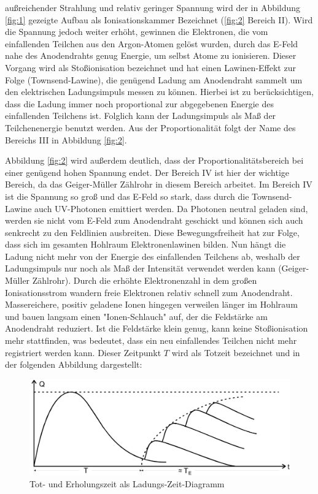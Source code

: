     \justifying außreichender Strahlung und relativ geringer Spannung wird
    der in Abbildung \ref{fig:1} gezeigte Aufbau als Ionisationskammer Bezeichnet (\ref{fig:2}
    Bereich II). Wird die Spannung jedoch weiter erhöht, gewinnen die Elektronen, die vom 
    einfallenden Teilchen aus den Argon-Atomen gelöst wurden, durch das E-Feld nahe des 
    Anodendrahts genug Energie, um selbst Atome zu ionisieren. Dieser Vorgang wird als 
    Stoßionisation bezeichnet und hat einen Lawinen-Effekt zur Folge (Townsend-Lawine), die
    genügend Ladung am Anodendraht sammelt um den elektrischen Ladungsimpuls messen zu können. Hierbei
    ist zu berücksichtigen, dass die Ladung immer noch proportional zur abgegebenen Energie des
    einfallenden Teilchens ist. Folglich kann der Ladungsimpuls als Maß der Teilchenenergie benutzt
    werden. Aus der Proportionalität folgt der Name des Bereichs III in Abbildung \ref{fig:2}.

    \justifying Abbildung \ref{fig:2} wird außerdem deutlich, dass der 
    Proportionalitätsbereich bei einer genügend hohen Spannung endet. Der Bereich IV ist hier
    der wichtige Bereich, da das Geiger-Müller Zählrohr in diesem Bereich arbeitet. Im Bereich
    IV ist die Spannung so groß und das E-Feld so stark, dass durch die Townsend-Lawine auch 
    UV-Photonen emittiert werden. Da Photonen neutral geladen sind, werden sie nicht vom E-Feld
    zum Anodendraht geschickt und können sich auch senkrecht zu den Feldlinien ausbreiten. Diese 
    Bewegungsfreiheit hat zur Folge, dass sich im gesamten Hohlraum Elektronenlawinen bilden. 
    Nun hängt die Ladung nicht mehr von der Energie des einfallenden Teilchens ab, weshalb der
    Ladungsimpuls nur noch als Maß der Intensität verwendet werden kann (Geiger-Müller Zählrohr).
    Durch die erhöhte Elektronenzahl in dem großen Ionisationsstrom wandern freie Elektronen 
    relativ schnell zum Anodendraht. Massereichere, positiv geladene Ionen hingegen verweilen
    länger im Hohlraum und bauen langsam einen "Ionen-Schlauch" auf, der die Feldstärke am 
    Anodendraht reduziert. Ist die Feldstärke klein genug, kann keine Stoßionisation mehr
    stattfinden, was bedeutet, dass ein neu einfallendes Teilchen nicht mehr registriert werden
    kann. Dieser Zeitpunkt $T$ wird als Totzeit bezeichnet und in der folgenden Abbildung dargestellt:

    \begin{figure}[H]
        \centering
        \includegraphics[width=\linewidth]{images/Erholungszeit.jpg}
        \caption{Tot- und Erholungszeit als Ladungs-Zeit-Diagramm \cite{V703}}
        \label{fig:3}
    \end{figure}

